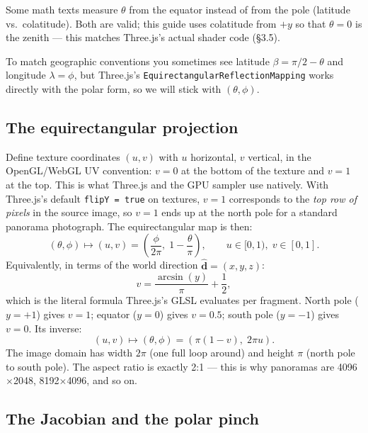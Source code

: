 \documentclass{article}
\begin{document}
Some math texts measure $\theta$ from the equator instead of from the pole
(latitude vs.\ colatitude). Both are valid; this guide uses colatitude from
$+y$ so that $\theta = 0$ is the zenith --- this matches Three.js's actual
shader code (\S3.5).

To match geographic conventions you sometimes see latitude
$\beta = \pi/2 - \theta$ and longitude $\lambda = \phi$, but Three.js's
\texttt{EquirectangularReflectionMapping} works directly with the polar form,
so we will stick with $(\theta, \phi)$.

\subsection{The equirectangular projection}

Define texture coordinates $(u, v)$ with $u$ horizontal, $v$ vertical, in
the OpenGL/WebGL UV convention: $v = 0$ at the bottom of the texture and
$v = 1$ at the top. This is what Three.js and the GPU sampler use natively.
With Three.js's default \texttt{flipY = true} on textures, $v = 1$ corresponds
to the \emph{top row of pixels} in the source image, so $v = 1$ ends up at
the north pole for a standard panorama photograph. The equirectangular map
is then:
\begin{equation}
  (\theta, \phi) \longmapsto (u, v) = \left( \frac{\phi}{2\pi}, \; 1 - \frac{\theta}{\pi} \right),
  \qquad u \in [0, 1), \; v \in [0, 1].
\end{equation}
Equivalently, in terms of the world direction $\hat{\mathbf{d}} = (x, y, z)$:
\[
  v = \frac{\arcsin(y)}{\pi} + \frac{1}{2},
\]
which is the literal formula Three.js's GLSL evaluates per fragment. North
pole ($y = +1$) gives $v = 1$; equator ($y = 0$) gives $v = 0.5$; south pole
($y = -1$) gives $v = 0$. Its inverse:
\begin{equation}
  (u, v) \longmapsto (\theta, \phi) = (\pi (1 - v), \; 2\pi u).
\end{equation}
The image domain has width $2\pi$ (one full loop around) and height $\pi$ (north
pole to south pole). The aspect ratio is exactly 2:1 --- this is why
panoramas are 4096$\times$2048, 8192$\times$4096, and so on.

\subsection{The Jacobian and the polar pinch}
\end{document}
